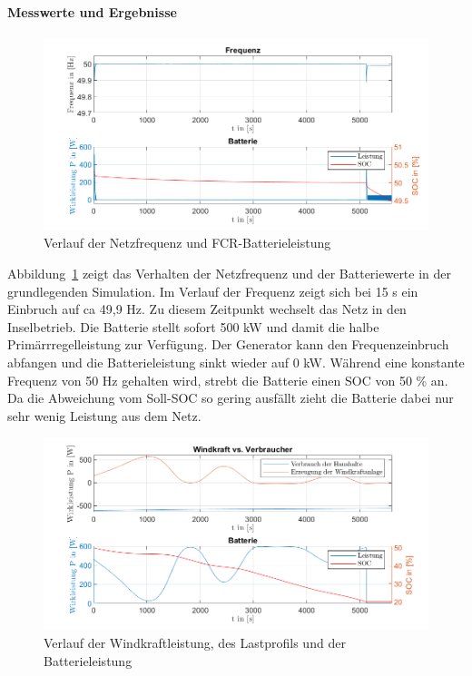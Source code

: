 \paragraph{Messwerte und Ergebnisse}

\begin{figure}[h!]
	\centering
	\includegraphics[width=14cm]{Abbildungen/FreqBat2.png}
	\caption{Verlauf der Netzfrequenz und FCR-Batterieleistung}\label{Verlauf1}
\end{figure}

Abbildung~\ref{Verlauf1} zeigt das Verhalten der Netzfrequenz und der Batteriewerte in der grundlegenden Simulation.
Im Verlauf der Frequenz zeigt sich bei 15 s ein Einbruch auf ca 49,9 Hz. 
Zu diesem Zeitpunkt wechselt das Netz in den Inselbetrieb.
Die Batterie stellt sofort 500 kW und damit die halbe Primärrregelleistung zur Verfügung.
Der Generator kann den Frequenzeinbruch abfangen und die Batterieleistung sinkt wieder auf 0 kW.
Während eine konstante Frequenz von 50 Hz gehalten wird, strebt die Batterie einen SOC von 50 \% an.
Da die Abweichung vom Soll-SOC so gering ausfällt zieht die Batterie dabei nur sehr wenig Leistung aus dem Netz.

\begin{figure}[h!]
	\centering
	\includegraphics[width=14cm]{Abbildungen/VerbrBat.png}
	\caption{Verlauf der Windkraftleistung, des Lastprofils und der Batterieleistung}\label{Verlauf2}
\end{figure}

